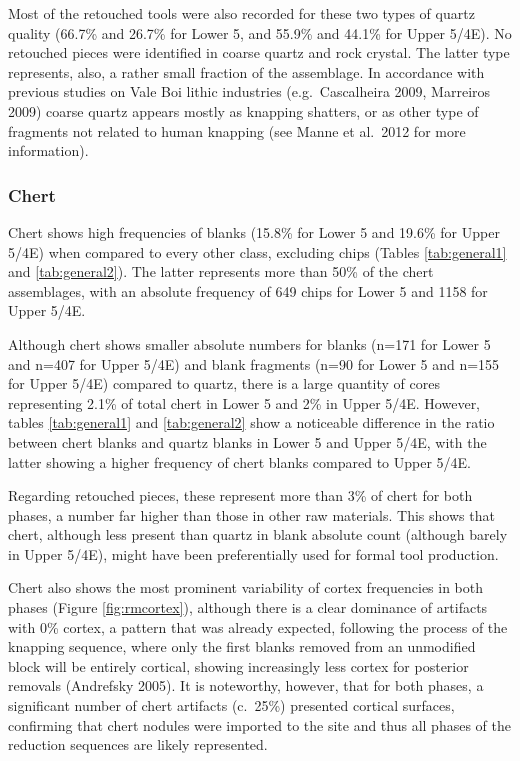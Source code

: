 \documentclass[12pt,twoside]{reedthesis}
\begin{document}
Most of the retouched tools were also recorded for these two types of quartz quality (66.7\% and 26.7\% for Lower 5, and 55.9\% and 44.1\% for Upper 5/4E). No retouched pieces were identified in coarse quartz and rock crystal. The latter type represents, also, a rather small fraction of the assemblage. In accordance with previous studies on Vale Boi lithic industries (e.g.~Cascalheira 2009, Marreiros 2009) coarse quartz appears mostly as knapping shatters, or as other type of fragments not related to human knapping (see Manne et al.~2012 for more information).

\hypertarget{chert}{%
\subsubsection{Chert}\label{chert}}

Chert shows high frequencies of blanks (15.8\% for Lower 5 and 19.6\% for Upper 5/4E) when compared to every other class, excluding chips (Tables \ref{tab:general1} and \ref{tab:general2}). The latter represents more than 50\% of the chert assemblages, with an absolute frequency of 649 chips for Lower 5 and 1158 for Upper 5/4E.

Although chert shows smaller absolute numbers for blanks (n=171 for Lower 5 and n=407 for Upper 5/4E) and blank fragments (n=90 for Lower 5 and n=155 for Upper 5/4E) compared to quartz, there is a large quantity of cores representing 2.1\% of total chert in Lower 5 and 2\% in Upper 5/4E. However, tables \ref{tab:general1} and \ref{tab:general2} show a noticeable difference in the ratio between chert blanks and quartz blanks in Lower 5 and Upper 5/4E, with the latter showing a higher frequency of chert blanks compared to Upper 5/4E.

Regarding retouched pieces, these represent more than 3\% of chert for both phases, a number far higher than those in other raw materials. This shows that chert, although less present than quartz in blank absolute count (although barely in Upper 5/4E), might have been preferentially used for formal tool production.

Chert also shows the most prominent variability of cortex frequencies in both phases (Figure \ref{fig:rmcortex}), although there is a clear dominance of artifacts with 0\% cortex, a pattern that was already expected, following the process of the knapping sequence, where only the first blanks removed from an unmodified block will be entirely cortical, showing increasingly less cortex for posterior removals (Andrefsky 2005). It is noteworthy, however, that for both phases, a significant number of chert artifacts (c.~25\%) presented cortical surfaces, confirming that chert nodules were imported to the site and thus all phases of the reduction sequences are likely represented.
\end{document}

